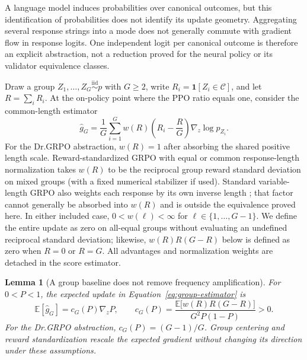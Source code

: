 \documentclass{article}
\newcommand{\1}{\mathbf 1}
\newcommand{\E}{\mathbb E}
\newtheorem{lemma}{Lemma}[section]
\theoremstyle{remark}
\theoremstyle{definition}
\theoremstyle{plain}
\begin{document}
A language model induces probabilities over canonical outcomes, but this
identification of probabilities does not identify its update geometry.
Aggregating several response strings into a mode does not generally commute
with gradient flow in response logits. One independent logit per canonical
outcome is therefore an explicit abstraction, not a reduction proved for the
neural policy or its validator equivalence classes.

Draw a group $Z_1,\ldots,Z_G\stackrel{\mathrm{iid}}{\sim}p$ with $G\ge2$,
write $R_i=\1[Z_i\in\mathcal C]$, and let $R=\sum_iR_i$. At the on-policy
point where the PPO ratio equals one, consider the common-length estimator
\begin{equation}
  \widehat g_G
  =\frac1G\sum_{i=1}^G
   w(R)\left(R_i-\frac{R}{G}\right)\nabla_z\log p_{Z_i}.
  \label{eq:group-estimator}
\end{equation}
For the Dr.GRPO abstraction, $w(R)=1$ after absorbing the shared positive
length scale. Reward-standardized GRPO with equal or common response-length
normalization takes $w(R)$ to be the reciprocal group reward standard
deviation on mixed groups (with a fixed numerical stabilizer if used).
Standard variable-length GRPO also weights each response by its own inverse
length \citep{shao2024deepseekmath,liu2025understanding}; that factor cannot
generally be absorbed into $w(R)$ and is outside the equivalence proved here.
In either included case, $0<w(\ell)<\infty$ for
$\ell\in\{1,\ldots,G-1\}$. We define the entire update as zero on all-equal
groups without evaluating an undefined reciprocal standard deviation;
likewise, $w(R)R(G-R)$ below is defined as zero when $R=0$ or $R=G$. All
advantages and normalization weights are detached in the score estimator.

\begin{lemma}[A group baseline does not remove frequency amplification]
\label{lem:grpo-mean}
For $0<P<1$, the expected update in Equation~\eqref{eq:group-estimator} is
\begin{equation}
  \E[\widehat g_G]
  =c_G(P)\nabla_z P,
  \qquad
  c_G(P)=
  \frac{\E\!\big[w(R)R(G-R)\big]}{G^2P(1-P)}>0.
  \label{eq:expected-group-gradient}
\end{equation}
For the Dr.GRPO abstraction, $c_G(P)=(G-1)/G$. Group centering and reward
standardization rescale the expected gradient without changing its direction
under these assumptions.
\end{lemma}
\end{document}
